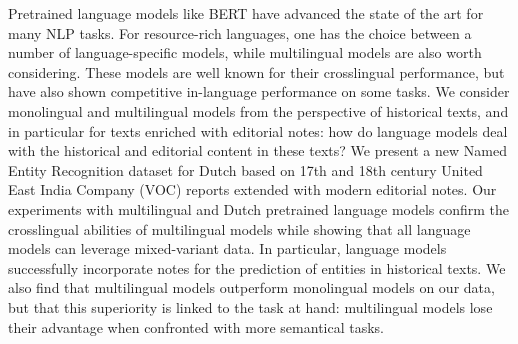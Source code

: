 Pretrained language models like BERT have advanced the state of the art for many NLP tasks. For resource-rich languages, one has the choice between a number of language-specific models, while multilingual models are also worth considering. These models are well known for their crosslingual performance, but have also shown competitive in-language performance on some tasks. We consider monolingual and multilingual models from the perspective of historical texts, and in particular for texts enriched with editorial notes: how do language models deal with the historical and editorial content in these texts? We present a new Named Entity Recognition dataset for Dutch based on 17th and 18th century United East India Company (VOC) reports extended with modern editorial notes. Our experiments with multilingual and Dutch pretrained language models confirm the crosslingual abilities of multilingual models while showing that all language models can leverage mixed-variant data. In particular, language models successfully incorporate notes for the prediction of entities in historical texts. We also find that multilingual models outperform monolingual models on our data, but that this superiority is linked to the task at hand: multilingual models lose their advantage when confronted with more semantical tasks.
